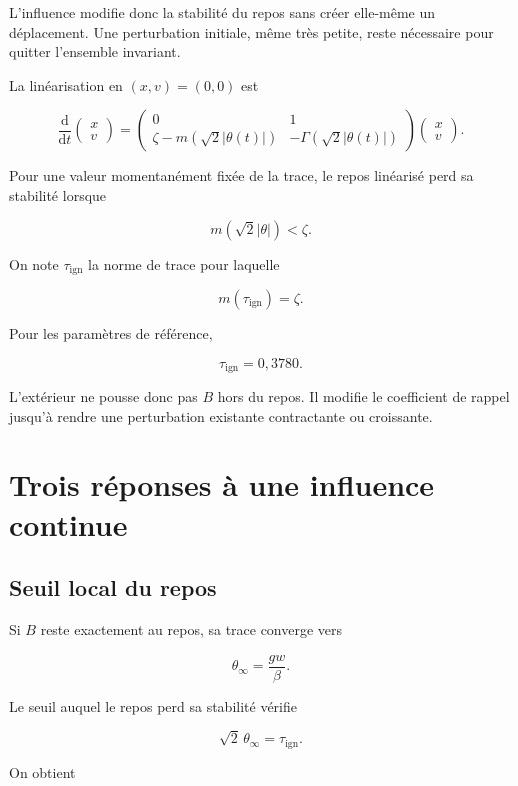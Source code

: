 L'influence modifie donc la stabilité du repos sans créer elle-même un
déplacement. Une perturbation initiale, même très petite, reste
nécessaire pour quitter l'ensemble invariant.

La linéarisation en \((x,v)=(0,0)\) est

\[
\frac{\mathrm d}{\mathrm dt}
\begin{pmatrix}
x\\ v
\end{pmatrix}
=
\begin{pmatrix}
0 & 1\\
\zeta-m(\sqrt2|\theta(t)|)
&
-\Gamma(\sqrt2|\theta(t)|)
\end{pmatrix}
\begin{pmatrix}
x\\ v
\end{pmatrix}.
\]

Pour une valeur momentanément fixée de la trace, le repos linéarisé perd sa stabilité lorsque

\[
m(\sqrt2|\theta|)<\zeta.
\]

On note \(\tau_{\mathrm{ign}}\) la norme de trace pour laquelle

\[
m(\tau_{\mathrm{ign}})=\zeta.
\]

Pour les paramètres de référence,

\[
\tau_{\mathrm{ign}}=0{,}3780.
\]

L'extérieur ne pousse donc pas \(B\) hors du repos. Il modifie le
coefficient de rappel jusqu'à rendre une perturbation existante
contractante ou croissante.

\chapter{Trois réponses à une influence continue}\label{t2-trois-reponses-a-une-influence-continue}

\section{Seuil local du repos}\label{t2-seuil-local-du-repos}

Si \(B\) reste exactement au repos, sa trace converge vers

\[
\theta_\infty=\frac{gw}{\beta}.
\]

Le seuil auquel le repos perd sa stabilité vérifie

\[
\sqrt2\,\theta_\infty=\tau_{\mathrm{ign}}.
\]

On obtient

